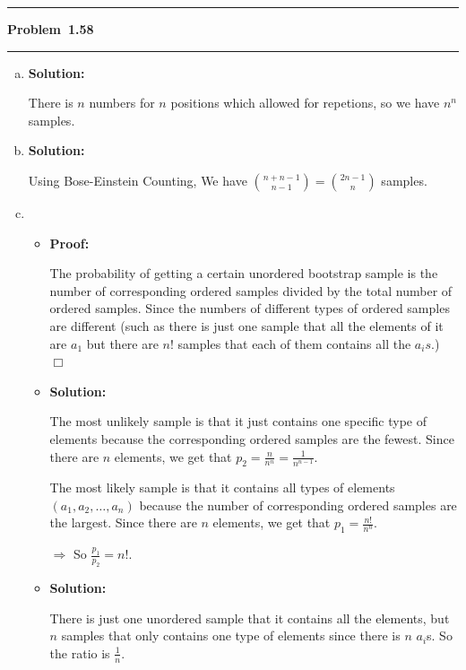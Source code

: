 \documentclass[10.5pt]{article}
\newcommand\question[1]{\vspace{.2in}\hrule\vspace{0.04in}\textbf{Problem\ #1}\vspace{.4em}\hrule\vspace{.10in}}
\newcommand\minsolution{\vspace{.3in}\textbf{Solution:}\vspace{.4em}\par}
\newcommand\minproof{\vspace{.3in}\textbf{Proof:}\vspace{.4em}\par}
\begin{document}
\pagebreak

	\question{1.58}


	\begin{enumerate}[(a)]
		\item \minsolution{}There is $n$ numbers for $n$ positions which allowed for repetions, so we have $n^n$ samples.
		\item \minsolution{}Using Bose-Einstein Counting, We have $\binom{n+n-1}{n-1} = \binom{2n-1}{n}$ samples.
		\item \ \\
		
		\begin{itemize}
			\item \minproof{}The probability of getting a certain unordered bootstrap sample is the number of corresponding 
			ordered samples divided by the total number of ordered samples. Since the numbers of different types of 
			ordered samples are different (such as there is just one sample that all the elements of it are $a_1$ but there are $n!$ samples that each of them contains all the ${a_i}s$.)\ $\Box$
			\item \minsolution{}The most unlikely sample is that it just contains one specific type of elements because the corresponding ordered samples are the fewest. Since there are $n$ elements, we get that $p_2 = \frac{n}{n^n} = \frac{1}{n^{n-1}}$.
			
			The most likely sample is that it contains all types of elements $(a_1, a_2, \dots, a_n)$ because the number of corresponding ordered samples are the largest. Since there are $n$ elements, we get that $p_1 = \frac{n!}{n^n}$.

			$\Rightarrow$ So $\frac{p_1}{p_2} = n!$.
			\item\minsolution{} There is just one unordered sample that it contains all the elements, but $n$ samples that only contains one type of elements since there is $n$ $a_i$s.
			So the ratio is $\frac{1}{n}$.
		\end{itemize}
	\end{enumerate}


\pagebreak
\end{document}
